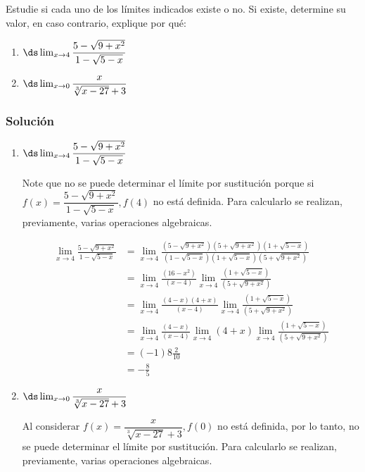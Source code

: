 Estudie si cada uno de los límites indicados existe o no. Si existe, determine su valor, en caso contrario, explique por qué:

\begin{enumerate}[label=\alph*)]
  \item $\ds\lim _{x \rightarrow 4} \dfrac{5-\sqrt{9+x^2}}{1-\sqrt{5-x}}$
  \item $\ds\lim _{x \rightarrow 0} \dfrac{x}{\sqrt[3]{x-27}+3}$
\end{enumerate}

\begin{soluciones}
  \subsubsection*{Solución}

  \begin{enumerate}[label=\alph*)]
    \item $\ds\lim _{x \rightarrow 4} \dfrac{5-\sqrt{9+x^2}}{1-\sqrt{5-x}}$
    
    Note que no se puede determinar el límite por sustitución porque si $f(x)=\dfrac{5-\sqrt{9+x^2}}{1-\sqrt{5-x}}, f(4)$ no está definida. Para calcularlo se realizan, previamente, varias operaciones algebraicas.

    $$
    \begin{aligned}
    \lim _{x \rightarrow 4} \frac{5-\sqrt{9+x^2}}{1-\sqrt{5-x}} & =\lim _{x \rightarrow 4} \frac{\left(5-\sqrt{9+x^2}\right)\left(5+\sqrt{9+x^2}\right)(1+\sqrt{5-x})}{(1-\sqrt{5-x})(1+\sqrt{5-x})\left(5+\sqrt{9+x^2}\right)} \\
    & =\lim _{x \rightarrow 4} \frac{\left(16-x^2\right)}{(x-4)} \lim _{x \rightarrow 4} \frac{(1+\sqrt{5-x})}{\left(5+\sqrt{9+x^2}\right)} \\
    & =\lim _{x \rightarrow 4} \frac{(4-x)(4+x)}{(x-4)} \lim _{x \rightarrow 4} \frac{(1+\sqrt{5-x})}{\left(5+\sqrt{9+x^2}\right)} \\
    & =\lim _{x \rightarrow 4} \frac{(4-x)}{(x-4)} \lim _{x \rightarrow 4}(4+x) \lim _{x \rightarrow 4} \frac{(1+\sqrt{5-x})}{\left(5+\sqrt{9+x^2}\right)} \\
    & =(-1) 8 \frac{2}{10} \\
    & =-\frac{8}{5}
    \end{aligned}
    $$

    \item $\ds\lim _{x \rightarrow 0} \dfrac{x}{\sqrt[3]{x-27}+3}$
    
    Al considerar $f(x)=\dfrac{x}{\sqrt[3]{x-27}+3}, f(0)$ no está definida, por lo tanto, no se puede determinar el límite por sustitución. Para calcularlo se realizan, previamente, varias operaciones algebraicas.


\end{enumerate}
\end{soluciones}
